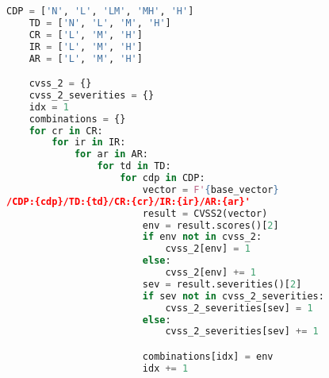 \begin{lstlisting}[caption={Kod programu obliczający wszystkie możliwe kombinacje dla parametrów środowiskowych CVSS 2.0.}, label={lst:wplyw:cvss2}, language=Python, captionpos=b]
    CDP = ['N', 'L', 'LM', 'MH', 'H']
    TD = ['N', 'L', 'M', 'H']
    CR = ['L', 'M', 'H']
    IR = ['L', 'M', 'H']
    AR = ['L', 'M', 'H']

    cvss_2 = {}
    cvss_2_severities = {}
    idx = 1
    combinations = {}
    for cr in CR:
        for ir in IR:
            for ar in AR:
                for td in TD:
                    for cdp in CDP:
                        vector = F'{base_vector}
/CDP:{cdp}/TD:{td}/CR:{cr}/IR:{ir}/AR:{ar}'
                        result = CVSS2(vector)
                        env = result.scores()[2]
                        if env not in cvss_2:
                            cvss_2[env] = 1
                        else:
                            cvss_2[env] += 1
                        sev = result.severities()[2]
                        if sev not in cvss_2_severities:
                            cvss_2_severities[sev] = 1
                        else:
                            cvss_2_severities[sev] += 1

                        combinations[idx] = env
                        idx += 1

\end{lstlisting}
